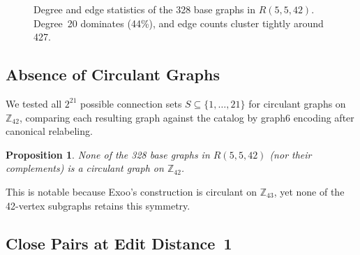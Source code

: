 \documentclass[11pt,a4paper]{article}
\newtheorem{proposition}[theorem]{Proposition}
\theoremstyle{definition}
\theoremstyle{remark}
\newcommand{\ZZ}{\mathbb{Z}}
\newcommand{\Rset}[3]{R(#1,#2,#3)}
\begin{document}
\begin{figure}[ht]
\centering
\begin{subfigure}[b]{0.48\textwidth}
\centering
{}
\end{subfigure}
\hfill
\begin{subfigure}[b]{0.48\textwidth}
\centering
{}
\end{subfigure}
\caption{Degree and edge statistics of the 328 base graphs
in $\Rset{5}{5}{42}$.  Degree~20 dominates (44\%), and
edge counts cluster tightly around 427.}
\label{fig:degree-edge}
\end{figure}

\subsection{Absence of Circulant Graphs}
\label{sec:no-circulant}

We tested all $2^{21}$ possible connection sets
$S \subseteq \{1, \ldots, 21\}$ for circulant graphs on
$\ZZ_{42}$, comparing each resulting graph against the
catalog by graph6 encoding after canonical relabeling.

\begin{proposition}
None of the 328 base graphs in $\Rset{5}{5}{42}$ (nor their
complements) is a circulant graph on $\ZZ_{42}$.
\end{proposition}

This is notable because Exoo's construction is circulant on
$\ZZ_{43}$, yet none of the 42-vertex subgraphs retains this
symmetry.

\subsection{Close Pairs at Edit Distance~1}
\end{document}
